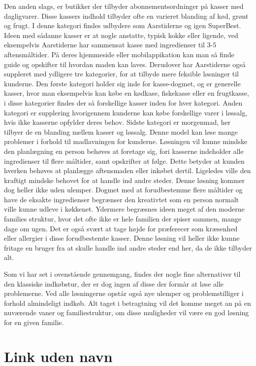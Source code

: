 Den anden slags, er butikker der tilbyder abonnementsordninger på kasser med dagligvarer.
Disse kassers indhold tilbyder ofte en varieret blanding af kød, grønt og frugt.
I denne kategori findes udbydere som Aarstiderne og igen SuperBest\citep{SOTA_MP_AAR, SOTA_MP_SB}.
Ideen med sådanne kasser er at nogle anstatte, typisk kokke eller ligende, ved eksempelvis Aarstiderne har sammensat kasse med ingredienser til 3-5 aftensmåltider.
På deres hjemmeside eller mobilappikation kan man så finde guide og opskifter til hvordan maden kan laves.
Derudover har Aarstiderne også suppleret med ydligere tre kategorier, for at tilbyde mere feksible løsninger til kunderne.
Den første kategori holder sig inde for kasse-dogmet, og er generelle kasser, hvor man eksempelvis kan købe en kødkase, fiskekasse eller en frugtkasse, i disse kategorier findes der så forskellige kasser inden for hver kategori.
Anden kategori er supplering hvorigennem kunderne kan købe forskellige varer i løssalg, hvis ikke kasserne opfylder deres behov.
Sidste kategori er morgenmad, her tilbyer de en blanding mellem kasser og løssalg.
Denne model kan løse mange problemer i forhold til madlavningen for kunderne.
Løsningen vil kunne mindske den planlægning en person behøves at foretage sig, fori kasserne indeholder alle ingredienser til flere måltider, samt opskrifter at følge.
Dette betyder at kunden  hverken behøves at planlægge aftensmaden eller inkøbet dertil.
Ligeledes ville den kraftigt mindske behovet for at handle ind andre steder.
Denne løsning kommer dog heller ikke uden ulemper.
Dogmet med at forudbestemme flere måltider og have de eksakte ingredienser begrænser den kreativtet som en person normalt ville kunne udleve i køkkenet.
Ydermere begræsnes ideen meget af den moderne families struktur, hvor det ofte ikke er hele familien der spiser sammen, mange dage om ugen.
Det er også svært at tage højde for præferecer som kræsenhed eller allergier i disse forudbestemte kasser.
Denne løsning vil heller ikke kunne fritage en bruger fra at skulle handle ind andre steder end her, da de ikke tilbyder alt.


Som vi har set i ovenstående gennemgang, findes der nogle fine alternativer til den klassiske indkøbstur, der er dog ingen af disse der formår at løse alle problemerne.
Ved alle løsningerne opstår også nye ulemper og problemstilliger i forhold almindeligt indkøb.
Alt taget i betragtning vil det komme meget an på en nuværende vaner og familiestruktur, om disse muligheder vil være en god løsning for en given familie.


\section{Link uden navn}